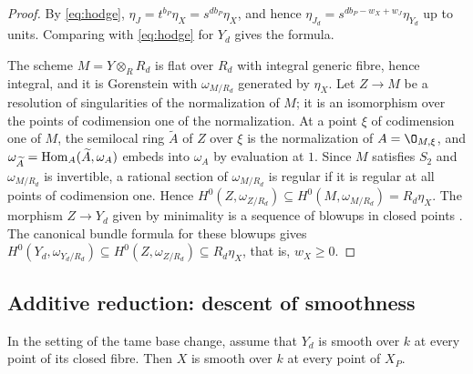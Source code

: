 \begin{proof}
By \eqref{eq:hodge}, $\eta_J = t^{b_P}\eta_X = s^{db_P}\eta_X$, and hence $\eta_{J_d} = s^{db_P-w_X+w_J}\eta_{Y_d}$ up to units.
Comparing with \eqref{eq:hodge} for $Y_d$ gives the formula.

The scheme $M = Y\otimes_RR_d$ is flat over $R_d$ with integral generic fibre, hence integral, and it is Gorenstein with $\omega_{M/R_d}$ generated by $\eta_X$.
Let $Z\to M$ be a resolution of singularities of the normalization of $M$; it is an isomorphism over the points of codimension one of the normalization.
At a point $\xi$ of codimension one of $M$, the semilocal ring $\widetilde A$ of $Z$ over $\xi$ is the normalization of $A = \O_{M,\xi}$, and $\omega_{\widetilde A} = \operatorname{Hom}_A(\widetilde A,\omega_A)$ embeds into $\omega_A$ by evaluation at $1$.
Since $M$ satisfies $S_2$ and $\omega_{M/R_d}$ is invertible, a rational section of $\omega_{M/R_d}$ is regular if it is regular at all points of codimension one.
Hence $H^0(Z,\omega_{Z/R_d})\subseteq H^0(M,\omega_{M/R_d}) = R_d\eta_X$.
The morphism $Z\to Y_d$ given by minimality is a sequence of blowups in closed points \cite[Tag~]{Stacks}.
The canonical bundle formula for these blowups gives $H^0(Y_d,\omega_{Y_d/R_d})\subseteq H^0(Z,\omega_{Z/R_d})\subseteq R_d\eta_X$, that is, $w_X\geq 0$.
\end{proof}



\subsection{Additive reduction: descent of smoothness}

\begin{lemma}\label{lem:descent}
In the setting of the tame base change, assume that $Y_d$ is smooth over $k$ at every point of its closed fibre.
Then $X$ is smooth over $k$ at every point of $X_P$.
\end{lemma}

